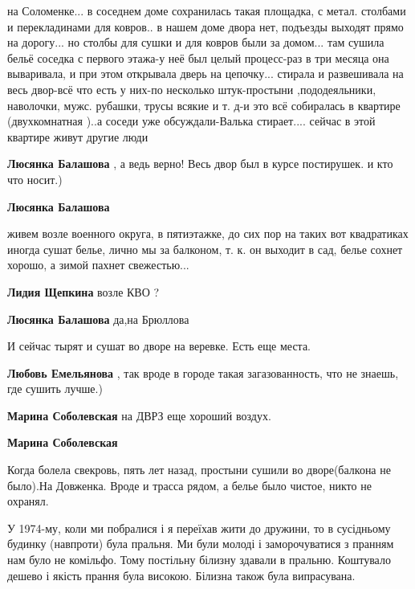 \begin{itemize}
на Соломенке... в соседнем доме сохранилась такая площадка, с метал. столбами и
перекладинами для ковров.. в нашем доме двора нет, подъезды выходят прямо на
дорогу... но столбы для сушки и для ковров были за домом... там сушила бельё
соседка с первого этажа-у неё был целый процесс-раз в три месяца она
вываривала, и при этом открывала дверь на цепочку... стирала и развешивала на
весь двор-всё что есть у них-по несколько штук-простыни
,пододеяльники, наволочки, мужс. рубашки, трусы всякие и т. д-и это всё собиралась
в квартире (двухкомнатная )..а соседи уже обсуждали-Валька стирает.... сейчас в
этой квартире живут другие люди

\begin{itemize} %
\textbf{Люсянка Балашова} , а ведь верно! Весь двор был в курсе постирушек. и кто что носит.)

\textbf{Люсянка Балашова} 

живем возле военного округа, в пятиэтажке, до сих пор на таких вот квадратиках
иногда сушат белье, лично мы за балконом, т. к. он выходит в сад, белье сохнет
хорошо, а зимой пахнет свежестью...


\textbf{Лидия Щепкина} возле КВО ?

\textbf{Люсянка Балашова} да,на Брюллова
\end{itemize} %

И сейчас тырят и сушат во дворе на веревке. Есть еще места.

\begin{itemize} %
\textbf{Любовь Емельянова} , так вроде в городе такая загазованность, что не знаешь, где сушить лучше.)

\textbf{Марина Соболевская} на ДВРЗ еще хороший воздух.

\textbf{Марина Соболевская} 

Когда болела свекровь, пять лет назад, простыни сушили во дворе(балкона не
было).На Довженка. Вроде и трасса рядом, а белье было чистое, никто не охранял.

\end{itemize} %


У 1974-му, коли ми побралися і я переїхав жити до дружини, то в сусідньому
будинку (навпроти) була пральня. Ми були молоді і заморочуватися з пранням нам
було не комільфо. Тому постільну білизну здавали в пральню. Коштувало дешево і
якість прання була високою. Білизна також була випрасувана.


\end{itemize}
